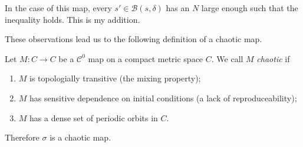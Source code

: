 \begin{remark}[]
	In the case of this map, every $s'\in \mathcal{B}\left(s, \delta \right)$ has an $N$ large enough such that the inequality holds.
	{\color{blue} This is my addition.}
\end{remark}

These observations lead us to the following definition of a chaotic map.

\begin{definition}
	Let $M:C\to C$ be a $\mathcal{C}^{0}$ map on a compact metric space $C$. We call $M$ \emph{chaotic} if
	\begin{enumerate}
		\item $M$ is topologially transitive (the mixing property);
		\item $M$ has sensitive dependence on initial conditions (a lack of reproduceability);
		\item $M$ has a dense set of periodic orbits in $C$.
	\end{enumerate}
\end{definition}
Therefore $\sigma$ is a chaotic map.
